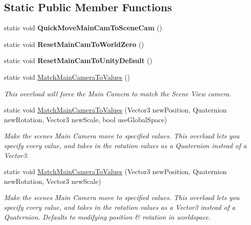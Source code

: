 \subsection*{Static Public Member Functions}
\begin{DoxyCompactItemize}
\item 
\mbox{\label{class_scene_view_actor_camera_a99fc940c929ecd0be983f6d5f606c7df}} 
static void {\bfseries Quick\+Move\+Main\+Cam\+To\+Scene\+Cam} ()
\item 
\mbox{\label{class_scene_view_actor_camera_a2c008ee53d553b0ff4ed85f5c02e8319}} 
static void {\bfseries Reset\+Main\+Cam\+To\+World\+Zero} ()
\item 
\mbox{\label{class_scene_view_actor_camera_a64bdb8bab8474234aa7d7feaca807eee}} 
static void {\bfseries Reset\+Main\+Cam\+To\+Unity\+Default} ()
\item 
static void \mbox{\hyperlink{class_scene_view_actor_camera_a3e544b9e43a8dba5304140b3661752b1}{Match\+Main\+Camera\+To\+Values}} ()
\begin{DoxyCompactList}\small\item\em This overload will force the Main Camera to match the Scene View camera. \end{DoxyCompactList}\item 
static void \mbox{\hyperlink{class_scene_view_actor_camera_a77349efed7b218f0c931926186cecd4e}{Match\+Main\+Camera\+To\+Values}} (Vector3 new\+Position, Quaternion new\+Rotation, Vector3 new\+Scale, bool use\+Global\+Space)
\begin{DoxyCompactList}\small\item\em Make the scene\textquotesingle{}s Main Camera move to specified values. This overload lets you specify every value, and takes in the rotation values as a Quaternion instead of a Vector3. \end{DoxyCompactList}\item 
static void \mbox{\hyperlink{class_scene_view_actor_camera_aceebf34bad9730f98c6e04fc264883be}{Match\+Main\+Camera\+To\+Values}} (Vector3 new\+Position, Quaternion new\+Rotation, Vector3 new\+Scale)
\begin{DoxyCompactList}\small\item\em Make the scene\textquotesingle{}s Main Camera move to specified values. This overload lets you specify every value, and takes in the rotation values as a Vector3 instead of a Quaternion. Defaults to modifying position \& rotation in worldspace. \end{DoxyCompactList}\item 

\end{DoxyCompactItemize}
